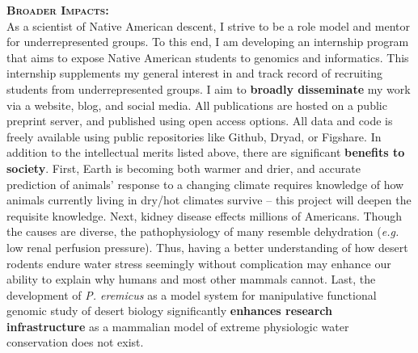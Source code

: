 \documentclass{article}
\begin{document}
\large{\textbf{\textsc{Broader Impacts:}}} \\
\normalsize
As a scientist of Native American descent, I strive to be a role model and mentor for underrepresented groups. To this end, I am developing an internship program that aims to expose Native American students to genomics and informatics. This internship supplements my general interest in and track record of recruiting students from underrepresented groups. I aim to \textbf{broadly disseminate} my work via a website, blog, and social media. All publications are hosted on a public preprint server, and published using open access options. All data and code is freely available using public repositories like Github, Dryad, or Figshare. In addition to the intellectual merits listed above, there are significant \textbf{benefits to society}. First, Earth is becoming both warmer and drier, and accurate prediction of animals' response to a changing climate requires knowledge of how animals currently living in dry/hot climates survive -- this project will deepen the requisite knowledge. Next, kidney disease effects millions of Americans. Though the causes are diverse, the pathophysiology of many resemble dehydration (\textit{e.g.} low renal perfusion pressure). Thus, having a better understanding of how desert rodents endure water stress seemingly without complication may enhance our ability to explain why humans and most other mammals cannot. Last, the development of \textit{P. eremicus} as a model system for manipulative functional genomic study of desert biology significantly \textbf{enhances research infrastructure} as a mammalian model of extreme physiologic water conservation does not exist.   

\\  
\end{document}
